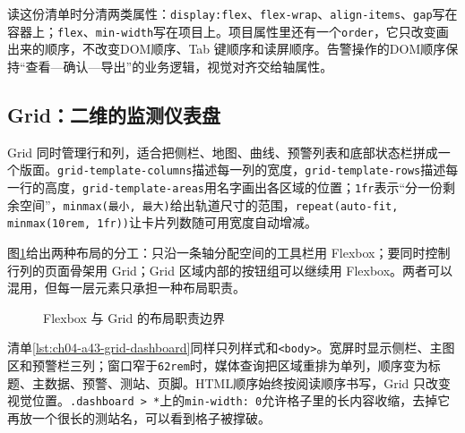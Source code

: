 读这份清单时分清两类属性：\texttt{display:flex}、\texttt{flex-wrap}、\texttt{align-items}、\texttt{gap}写在容器上；\texttt{flex}、\texttt{min-width}写在项目上。项目属性里还有一个\texttt{order}，它只改变画出来的顺序，不改变DOM顺序、Tab 键顺序和读屏顺序。告警操作的DOM顺序保持“查看—确认—导出”的业务逻辑，视觉对齐交给轴属性。

\subsection{Grid：二维的监测仪表盘}

Grid 同时管理行和列，适合把侧栏、地图、曲线、预警列表和底部状态栏拼成一个版面。\texttt{grid-template-columns}描述每一列的宽度，\texttt{grid-template-rows}描述每一行的高度，\texttt{grid-template-areas}用名字画出各区域的位置；\texttt{1fr}表示“分一份剩余空间”，\texttt{minmax(最小, 最大)}给出轨道尺寸的范围，\texttt{repeat(auto-fit, minmax(10rem, 1fr))}让卡片列数随可用宽度自动增减。

图\ref{fig:ch04-layout-choice}给出两种布局的分工：只沿一条轴分配空间的工具栏用 Flexbox；要同时控制行列的页面骨架用 Grid；Grid 区域内部的按钮组可以继续用 Flexbox。两者可以混用，但每一层元素只承担一种布局职责。

\begin{figure}[htbp]
\centering
{}
\caption{Flexbox 与 Grid 的布局职责边界}
\label{fig:ch04-layout-choice}
\end{figure}

清单\ref{lst:ch04-a43-grid-dashboard}同样只列样式和\texttt{<body>}。宽屏时显示侧栏、主图区和预警栏三列；窗口窄于\texttt{62rem}时，媒体查询把区域重排为单列，顺序变为标题、主数据、预警、测站、页脚。HTML顺序始终按阅读顺序书写，Grid 只改变视觉位置。\texttt{.dashboard > *}上的\texttt{min-width: 0}允许格子里的长内容收缩，去掉它再放一个很长的测站名，可以看到格子被撑破。

